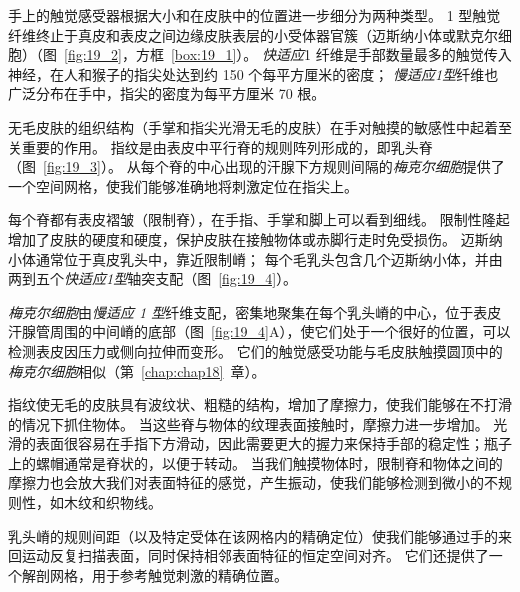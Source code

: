 手上的触觉感受器根据大小和在皮肤中的位置进一步细分为两种类型。
1 型触觉纤维终止于真皮和表皮之间边缘皮肤表层的小受体器官簇（迈斯纳小体或默克尔细胞）（图~\ref{fig:19_2}，方框~\ref{box:19_1}）。
\textit{快适应}1 纤维是手部数量最多的触觉传入神经，在人和猴子的指尖处达到约 150 个每平方厘米的密度；
\textit{慢适应1型}纤维也广泛分布在手中，指尖的密度为每平方厘米 70 根。


\begin{proposition}[指纹结构提高了手部的触摸灵敏度] \label{box:19_1}
	
	\quad \quad 无毛皮肤的组织结构（手掌和指尖光滑无毛的皮肤）在手对触摸的敏感性中起着至关重要的作用。
	指纹是由表皮中平行脊的规则阵列形成的，即乳头脊（图~\ref{fig:19_3}）。
	从每个脊的中心出现的汗腺下方规则间隔的\textit{梅克尔细胞}提供了一个空间网格，使我们能够准确地将刺激定位在指尖上。
	
	\quad \quad 每个脊都有表皮褶皱（限制脊），在手指、手掌和脚上可以看到细线。
	限制性隆起增加了皮肤的硬度和硬度，保护皮肤在接触物体或赤脚行走时免受损伤。
	迈斯纳小体通常位于真皮乳头中，靠近限制嵴；
	每个毛乳头包含几个迈斯纳小体，并由两到五个\textit{快适应1型}轴突支配（图~\ref{fig:19_4}）。
	
	\quad \quad \textit{梅克尔细胞}由\textit{慢适应 1 型}纤维支配，密集地聚集在每个乳头嵴的中心，位于表皮汗腺管周围的中间嵴的底部（图~\ref{fig:19_4}A），使它们处于一个很好的位置，可以检测表皮因压力或侧向拉伸而变形。
	它们的触觉感受功能与毛皮肤触摸圆顶中的\textit{梅克尔细胞}相似（第~\ref{chap:chap18}~章）。
	
	\quad \quad 指纹使无毛的皮肤具有波纹状、粗糙的结构，增加了摩擦力，使我们能够在不打滑的情况下抓住物体。
	当这些脊与物体的纹理表面接触时，摩擦力进一步增加。
	光滑的表面很容易在手指下方滑动，因此需要更大的握力来保持手部的稳定性；瓶子上的螺帽通常是脊状的，以便于转动。
	当我们触摸物体时，限制脊和物体之间的摩擦力也会放大我们对表面特征的感觉，产生振动，使我们能够检测到微小的不规则性，如木纹和织物线。
	
	\quad \quad 乳头嵴的规则间距（以及特定受体在该网格内的精确定位）使我们能够通过手的来回运动反复扫描表面，同时保持相邻表面特征的恒定空间对齐。
	它们还提供了一个解剖网格，用于参考触觉刺激的精确位置。
	
\end{proposition}



